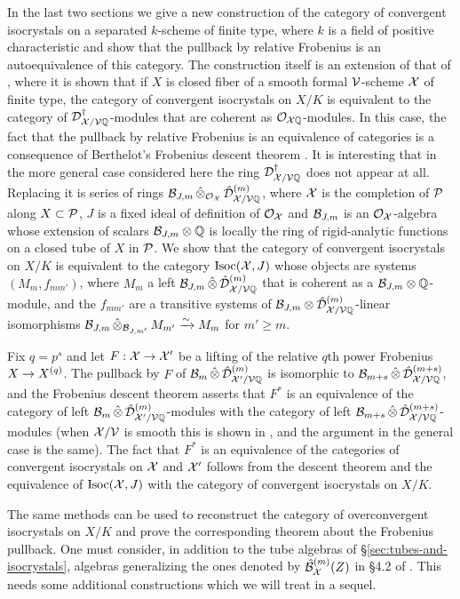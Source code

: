 \documentclass{article}
\theoremstyle{change}
\numberwithin{equation}{subsubsection}
\begin{document}
In the last two sections we give a new construction of the category of
convergent isocrystals on a separated $k$-scheme of finite type, where
$k$ is a field of positive characteristic and show that the pullback
by relative Frobenius is an autoequivalence of this category. The
construction itself is an extension of that of \cite{berthelot:1996},
where it is shown that if $X$ is closed fiber of a smooth formal
${\cal V}$-scheme ${\cal X}$ of finite type, the category of convergent
isocrystals on $X/K$ is equivalent to the category of
${\cal D}^\dagger_{{\cal X}/{\cal V}{\mathbb Q}}$-modules that are coherent as
${\cal O}_{{\cal X}{\mathbb Q}}$-modules. In this case, the fact that the pullback by
relative Frobenius is an equivalence of categories is a consequence of
Berthelot's Frobenius descent theorem \cite{berthelot:2000}. It is
interesting that in the more general case considered here the ring
${\cal D}^\dagger_{{\cal X}/{\cal V}{\mathbb Q}}$ does not appear at all. Replacing it is series of
rings ${\cal B}_{J,m}\mathop{\hat\otimes}_{{\cal O}_{\cal X}}{\hat{\cal D}}^{({m})}_{{\cal X}/{\cal V}{\mathbb Q}}$, where ${\cal X}$
is the completion of ${\cal P}$ along $X\subset{\cal P}$, $J$ is a fixed ideal
of definition of ${\cal O}_{\cal X}$ and ${\cal B}_{J,m}$ is an ${\cal O}_{\cal X}$-algebra whose
extension of scalars ${\cal B}_{J,m}\otimes{\mathbb Q}$ is locally the ring of
rigid-analytic functions on a closed tube of $X$ in ${\cal P}$. We show
that the category of convergent isocrystals on $X/K$ is equivalent to
the category $\mathrm{Isoc}({\cal X},J)$ whose objects are systems $(M_m,f_{mm'})$,
where $M_m$ a left ${\cal B}_{J,m}\mathop{\hat\otimes}{\hat{\cal D}}^{({m})}_{{\cal X}/{\cal V}{\mathbb Q}}$ that is
coherent as a ${\cal B}_{J,m}\otimes{\mathbb Q}$-module, and the $f_{mm'}$ are a
transitive systems of ${\cal B}_{J,m}\otimes{\hat{\cal D}}^{({m})}_{{\cal X}/{\cal V}{\mathbb Q}}$-linear
isomorphisms ${\cal B}_{J,m}\mathop{\hat\otimes}_{{\cal B}_{J,m'}}M_{m'}\xrightarrow{\sim} M_m$ for
$m'\ge m$.

Fix $q=p^s$ and let $F:{\cal X}\to{\cal X}'$ be a lifting of the relative $q$th
power Frobenius $X\to{X}^{({q})}$. The pullback by $F$ of
${\cal B}_m\mathop{\hat\otimes}{\hat{\cal D}}^{({m})}_{{\cal X}'/{\cal V}{\mathbb Q}}$ is isomorphic to
${\cal B}_{m+s}\mathop{\hat\otimes}{\hat{\cal D}}^{({m+s})}_{{\cal X}/{\cal V}{\mathbb Q}}$, and the Frobenius descent
theorem asserts that $F^*$ is an equivalence of the category of left
${\cal B}_m\mathop{\hat\otimes}{\hat{\cal D}}^{({m})}_{{\cal X}'/{\cal V}{\mathbb Q}}$-modules with the category of
left ${\cal B}_{m+s}\mathop{\hat\otimes}{\hat{\cal D}}^{({m+s})}_{{\cal X}/{\cal V}{\mathbb Q}}$-modules (when
${\cal X}/{\cal V}$ is smooth this is shown in \cite{berthelot:2000}, and the
argument in the general case is the same). The fact that $F^*$ is an
equivalence of the categories of convergent isocrystals on ${\cal X}$ and
${\cal X}'$ follows from the descent theorem and the equivalence of
$\mathrm{Isoc}({\cal X},J)$ with the category of convergent isocrystals on $X/K$.

The same methods can be used to reconstruct the category of
overconvergent isocrystals on $X/K$ and prove the corresponding
theorem about the Frobenius pullback. One must consider, in addition
to the tube algebras of \S\ref{sec:tubes-and-isocrystals}, algebras
generalizing the ones denoted by ${\hat{{\cal B}}}^{({m})}_{\cal X}(Z)$ in \S4.2 of
\cite{berthelot:1996}. This needs some additional constructions which
we will treat in a sequel.
\end{document}
